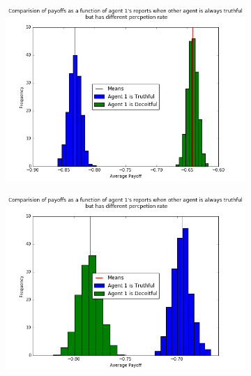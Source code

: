 \documentclass{scrartcl}
\begin{document}
\begin{figure}[H]
\caption{Relaxing Assumption 2}
\begin{subfigure}{0.4\textwidth}
\includegraphics[scale=0.4]{pp_2}
\end{subfigure}
\hspace{0.1\textwidth}
\begin{subfigure}{0.4\textwidth}
\includegraphics[scale=0.4]{pp_3}
\end{subfigure}
\end{figure}
\end{document}
